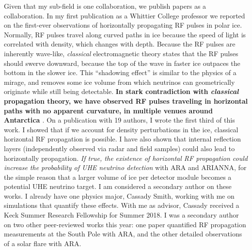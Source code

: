 \documentclass[../../main.tex]{subfiles}
\begin{document}
Given that my sub-field is one collaboration, we publish papers as a collaboration.  In my first publication as a Whittier College professor we reported on the first-ever observations of horizontally propagating RF pulses in polar ice.  Normally, RF pulses travel along curved paths in ice because the speed of light is correlated with density, which changes with depth.  Because the RF pulses are inherently wave-like, \textit{classical} electromagnetic theory states that the RF pulses should swerve downward, because the top of the wave in faster ice outpaces the bottom in the slower ice.  This ``shadowing effect'' is similar to the physics of a mirage, and removes some ice volume from which neutrinos can geometrically originate while still being detectable.  \textbf{In stark contradiction with \textit{classical} propagation theory, we have observed RF pulses traveling in horizontal paths with no apparent curvature, in multiple venues around Antarctica \cite{horizPaper}}.  On a publication with 19 authors, I wrote the first third of this work.  I showed that if we account for density perturbations in the ice, classical horizontal RF propagation is possible.  I have also shown that internal reflection layers (independently observed via radar and field samples) could also lead to horizontally propagation.  \textit{If true, the existence of horizontal RF propagation could increase the probability of UHE neutrino detection} with ARA and ARIANNA, for the simple reason that a larger volume of ice per detector module becomes a potential UHE neutrino target. I am considered a secondary author on these works. I already have one physics major, Cassady Smith, working with me on simulations that quantify these effects.  With me as advisor, Cassady received a Keck Summer Research Fellowship for Summer 2018.  I was a secondary author on two other peer-reviewed works this year: one paper quantified RF propagation measurements at the South Pole with ARA, and the other detailed observations of a solar flare with ARA.
\end{document}
